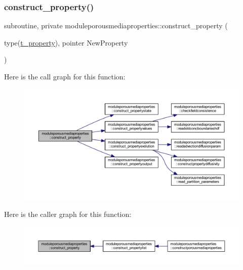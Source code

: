 \subsubsection{\texorpdfstring{construct\+\_\+property()}{construct\_property()}}
{\footnotesize\ttfamily subroutine, private moduleporousmediaproperties\+::construct\+\_\+property (\begin{DoxyParamCaption}\item[{type(\mbox{\hyperlink{structmoduleporousmediaproperties_1_1t__property}{t\+\_\+property}}), pointer}]{New\+Property }\end{DoxyParamCaption})\hspace{0.3cm}{\ttfamily [private]}}

Here is the call graph for this function\+:\nopagebreak
\begin{figure}[H]
\begin{center}
\leavevmode
\includegraphics[width=350pt]{namespacemoduleporousmediaproperties_a3cb901c1fa6f5b569ff3841c39531ce5_cgraph}
\end{center}
\end{figure}
Here is the caller graph for this function\+:\nopagebreak
\begin{figure}[H]
\begin{center}
\leavevmode
\includegraphics[width=350pt]{namespacemoduleporousmediaproperties_a3cb901c1fa6f5b569ff3841c39531ce5_icgraph}
\end{center}
\end{figure}
\mbox{\label{namespacemoduleporousmediaproperties_a7475f0f419f35758071e5f74d001e408}} 
